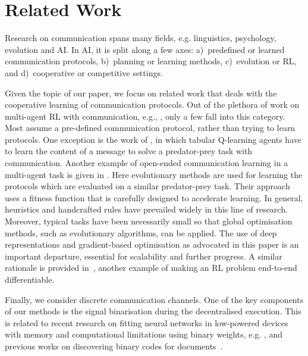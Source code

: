 \section{Related Work}
\label{sec:related_work}
Research on communication spans many fields, e.g. linguistics, psychology, evolution and AI.  In AI, it is split along a few axes: a)~predefined or learned communication protocols, b)~planning or learning methods, c)~evolution or RL, and d)~cooperative or competitive settings. 

Given the topic of our paper, we focus on related work that deals with the cooperative learning of communication protocols. Out of the plethora of work on multi-agent RL with communication, e.g., \cite{tan1993multi,melo2011querypomdp,Panait2005387,Zhang20131101,kasai2008learning}, only a few fall into this category. Most assume a pre-defined communication protocol, rather than trying to learn protocols. 
One exception is the work of \citet{kasai2008learning}, in which tabular Q-learning agents have to learn the content of a message to solve a predator-prey task with communication.
Another example of open-ended communication learning in a multi-agent task is given in \cite{giles2002learning}. Here evolutionary methods are used for learning the protocols which are evaluated on a similar predator-prey task. Their approach uses a fitness function that is carefully designed to accelerate learning.
In general, heuristics and  handcrafted rules have prevailed widely in this line of research. Moreover, typical tasks have been necessarily small so that global optimisation methods, such as evolutionary algorithms, can be applied. The use of deep representations and gradient-based optimisation as advocated in this paper is an important departure, essential for scalability and further progress. A similar rationale is provided in~\cite{gregor2015draw}, another example of making an RL problem end-to-end differentiable.

Finally, we consider discrete communication channels. One of the key components of our methods is the signal binarisation during the decentralised execution. This is related to recent research on fitting neural networks in low-powered devices with memory and computational limitations using binary weights, e.g. \cite{courbariaux2016binarynet}, and previous works on discovering binary codes for documents~\cite{hinton2011discovering}.